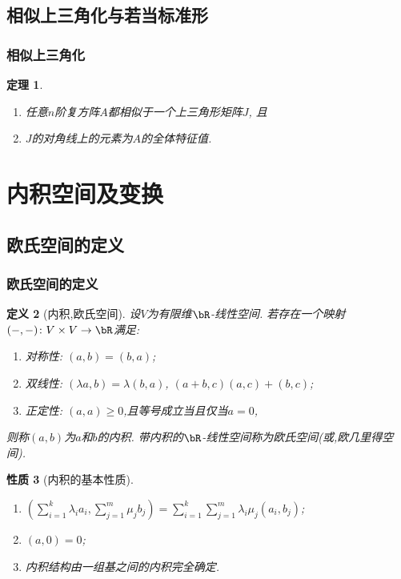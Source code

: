 \documentclass{article}
\newtheorem{theorem}{定理}  %
\newtheorem{proposition}[theorem]{性质}  %
\newtheorem{definition}[theorem]{定义}
\renewcommand{\blue }[1]{{\textcolor[rgb]{0,0,1}{#1}}}
\begin{document}
\subsection{相似上三角化与若当标准形}

\subsubsection{相似上三角化}
\begin{theorem}
\begin{enumerate}
\item 任意$n$阶复方阵$A$都相似于一个上三角形矩阵$J$, 且
\item $J$的对角线上的元素为$A$的全体特征值.
\end{enumerate}
\end{theorem}

\newpage




\section{内积空间及变换}


\subsection{欧氏空间的定义}

\subsubsection{欧氏空间的定义}
\begin{definition}[内积,欧氏空间]
设$V$为有限维$\bR$-线性空间.
若存在一个映射$(-,-)\colon V\times V \rightarrow \bR$满足:
\begin{enumerate}
\item 对称性: $(a,b)=(b,a)$;
\item 双线性: $(\lambda a,b)=\lambda(b,a)$, $(a+b,c)(a,c)+(b,c)$;
\item 正定性: $(a,a)\geq0$,且等号成立当且仅当$a=0$,
\end{enumerate}
则称$(a,b)$为$a$和$b$的\blue{内积}.
带内积的$\bR$-线性空间称为\blue{欧氏空间}(或,\blue{欧几里得空间}).
\end{definition}
\begin{proposition}[内积的基本性质]
\begin{enumerate}
\item $\left(\sum_{i=1}^{k}\lambda_ia_i,\sum_{j=1}^{m}\mu_jb_j\right) = \sum_{i=1}^{k}\sum_{j=1}^{m} \lambda_i\mu_j(a_i,b_j)$;
\item $(a,0)=0$;
\item 内积结构由一组基之间的内积完全确定.
\end{enumerate}
\end{proposition}
\end{document}
